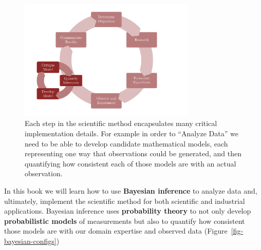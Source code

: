 \documentclass[
  letterpaper,
  DIV=11,
  numbers=noendperiod]{scrartcl}
\begin{document}
\begin{figure}

{\centering \includegraphics[width=0.75\textwidth,height=\textheight]{figures/scientific_method/box/box.pdf}

}

\caption{\label{fig-scientific-method-box}Each step in the scientific
method encapsulates many critical implementation details. For example in
order to ``Analyze Data'' we need to be able to develop candidate
mathematical models, each representing one way that observations could
be generated, and then quantifying how consistent each of those models
are with an actual observation.}

\end{figure}

In this book we will learn how to use \textbf{Bayesian inference} to
analyze data and, ultimately, implement the scientific method for both
scientific and industrial applications. Bayesian inference uses
\textbf{probability theory} to not only develop \textbf{probabilistic
models} of measurements but also to quantify how consistent those models
are with our domain expertise and observed data
(Figure~\ref{fig-bayesian-configs})
\end{document}
